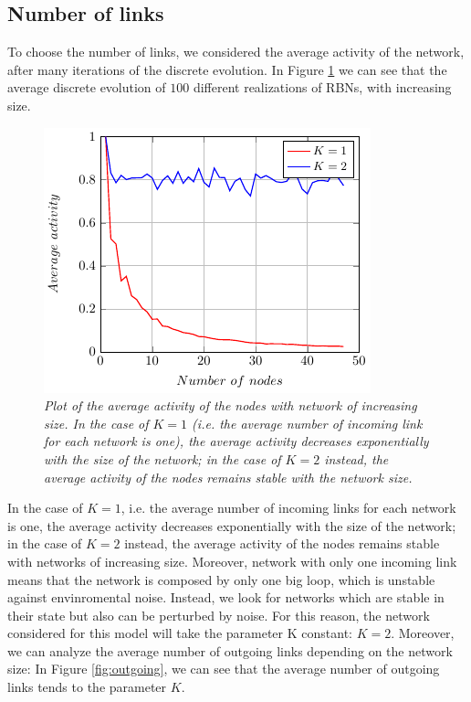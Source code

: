 \subsection{Number of links}
To choose the number of links, we considered the average activity of the network, after many iterations of the discrete evolution. In Figure \ref{fig:K} we can see that the average discrete evolution of $100$ different realizations of RBNs, with increasing size.
\begin{figure}[h]
\centering
\includegraphics[scale=1.5]{images/K.pdf}
\caption{\emph{Plot of the average activity of the nodes with network of increasing size.
In the case of $K=1$ (i.e. the average number of incoming link for each network is one), the average activity decreases exponentially with the size of the network; in the case of $K=2$ instead, the average activity of the nodes remains stable with the network size.}}
\label{fig:K}
\end{figure}
In the case of $K=1$, i.e. the average number of incoming links for each network is one, the average activity decreases exponentially with the size of the network; in the case of $K=2$ instead, the average activity of the nodes remains stable with networks of increasing size. Moreover, network with only one incoming link means that the network is composed by only one big loop, which is unstable against envinromental noise. Instead, we look for networks which are stable in their state but also can be perturbed by noise. For this reason, the network considered for this model will take the parameter K constant: $K=2$.
Moreover, we can analyze the average number of outgoing links depending on the network size: In Figure \ref{fig:outgoing}, we can see that the average number of outgoing links tends to the parameter $K$.
